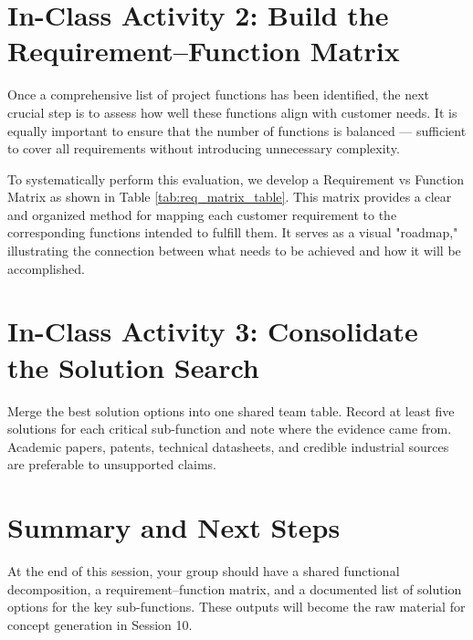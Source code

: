 
% 
\section{In-Class Activity 2: Build the Requirement--Function Matrix}

Once a comprehensive list of project functions has been identified, the next crucial step is to assess how well these functions align with customer needs. It is equally important to ensure that the number of functions is balanced — sufficient to cover all requirements without introducing unnecessary complexity.

To systematically perform this evaluation, we develop a Requirement vs Function Matrix as shown in Table \ref{tab:req_matrix_table}. This matrix provides a clear and organized method for mapping each customer requirement to the corresponding functions intended to fulfill them. It serves as a visual "roadmap," illustrating the connection between what needs to be achieved and how it will be accomplished.


% 

\section{In-Class Activity 3: Consolidate the Solution Search}

Merge the best solution options into one shared team table. Record at least five solutions for each critical sub-function and note where the evidence came from. Academic papers, patents, technical datasheets, and credible industrial sources are preferable to unsupported claims.

\section{Summary and Next Steps}

At the end of this session, your group should have a shared functional decomposition, a requirement--function matrix, and a documented list of solution options for the key sub-functions. These outputs will become the raw material for concept generation in Session 10.
